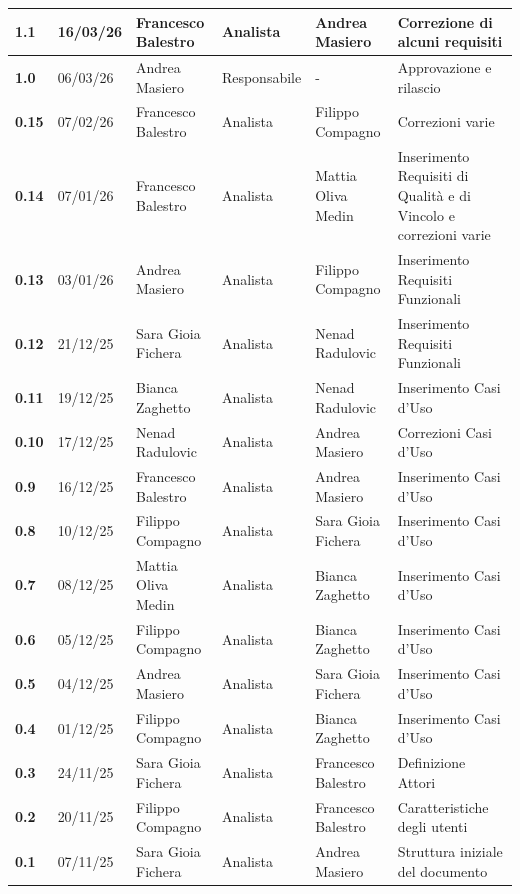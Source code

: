 \documentclass[a4paper,12pt]{article}
\begin{document}
{\begin{longtable}{|p{1cm}|p{1.7cm}|p{3.5cm}|p{2.5cm}|p{2.5cm}|p{3.2cm}|}
            \textbf{1.1} & 16/03/26 & Francesco Balestro & Analista & Andrea Masiero & Correzione di alcuni requisiti \\
            \hline
            \textbf{1.0} & 06/03/26 & Andrea Masiero & Responsabile & - & Approvazione e rilascio \\
            \hline
            \textbf{0.15} & 07/02/26 & Francesco Balestro & Analista & Filippo Compagno & Correzioni varie \\
            \hline
            \textbf{0.14} & 07/01/26 & Francesco Balestro & Analista & Mattia Oliva Medin & Inserimento Requisiti di Qualità e di Vincolo e correzioni varie \\
            \hline
            \textbf{0.13} & 03/01/26 & Andrea Masiero & Analista & Filippo Compagno & Inserimento Requisiti Funzionali \\
            \hline
            \textbf{0.12} & 21/12/25 &  Sara Gioia Fichera & Analista & Nenad Radulovic & Inserimento Requisiti Funzionali \\
            \hline
            \textbf{0.11} & 19/12/25 & Bianca Zaghetto & Analista & Nenad Radulovic & Inserimento Casi d'Uso \\
            \hline
            \textbf{0.10} & 17/12/25 & Nenad Radulovic & Analista & Andrea Masiero & Correzioni Casi d'Uso \\
            \hline
            \textbf{0.9} & 16/12/25 & Francesco Balestro & Analista & Andrea Masiero & Inserimento Casi d'Uso \\
            \hline
            \textbf{0.8} & 10/12/25 & Filippo Compagno & Analista & Sara Gioia Fichera & Inserimento Casi d'Uso \\
            \hline
            \textbf{0.7} & 08/12/25 & Mattia Oliva Medin & Analista & Bianca Zaghetto & Inserimento Casi d'Uso \\
            \hline
            \textbf{0.6} & 05/12/25 & Filippo Compagno & Analista & Bianca Zaghetto & Inserimento Casi d'Uso \\
            \hline
            \textbf{0.5} & 04/12/25 & Andrea Masiero & Analista & Sara Gioia Fichera & Inserimento Casi d'Uso \\
            \hline
            \textbf{0.4} & 01/12/25 & Filippo Compagno & Analista & Bianca Zaghetto & Inserimento Casi d'Uso \\
            \hline
            \textbf{0.3} & 24/11/25 & Sara Gioia Fichera & Analista & Francesco Balestro &  Definizione Attori \\
            \hline
            \textbf{0.2} & 20/11/25 & Filippo Compagno & Analista & Francesco Balestro & Caratteristiche degli utenti \\
            \hline
            \textbf{0.1} & 07/11/25 & Sara Gioia Fichera & Analista & Andrea Masiero & Struttura iniziale del documento \\
            \hline
        \end{longtable}
    }
    \newpage
    
\end{document}
